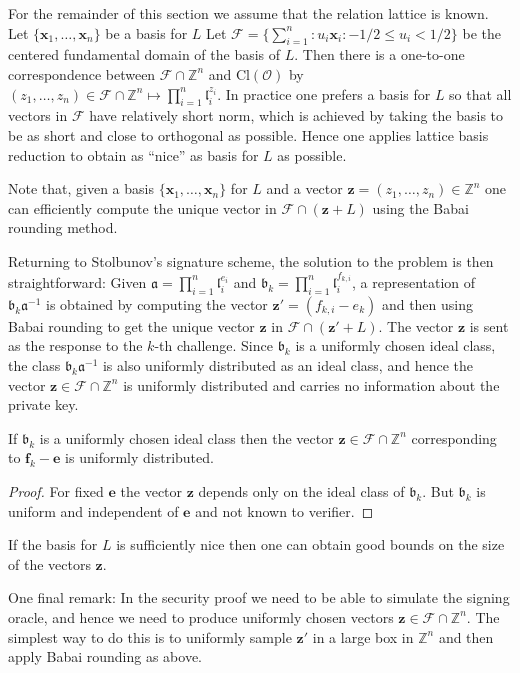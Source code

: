 \documentclass{llncs}
\newcommand{\FF}{\mathcal{F}}
\newcommand{\OO}{\mathcal{O}}
\newcommand{\Z}{\mathbb{Z}}
\newcommand{\Cl}{\text{Cl}}
\renewcommand{\a}{\mathfrak{a}}
\renewcommand{\b}{\mathfrak{b}}
\renewcommand{\l}{\mathfrak{l}}
\newcommand{\e}{\textbf{e}}
\newcommand{\f}{\textbf{f}}
\newcommand{\x}{\textbf{x}}
\newcommand{\z}{\textbf{z}}
\begin{document}
For the remainder of this section we assume that the relation lattice is known.
Let $\{ \x_1, \dots, \x_n \}$ be a basis for $L$
Let $\FF = \{ \sum_{i=1}^n : u_i \x_i : -1/2 \le u_i < 1/2 \}$ be the centered fundamental domain of the basis of $L$.
Then there is a one-to-one correspondence between $\FF \cap \Z^n$ and $\Cl(\OO)$ by
$(z_1, \dots, z_n ) \in \FF \cap \Z^n  \mapsto \prod_{i=1}^n \l_i^{z_i}$.
In practice one prefers a basis for $L$ so that all vectors in $\FF$ have relatively short norm, which is achieved by taking the basis to be as short and close to orthogonal as possible. Hence one applies lattice basis reduction to obtain as ``nice'' as basis for $L$ as possible.

Note that, given a basis $\{ \x_1, \dots, \x_n \}$ for $L$ and a vector $\z = (z_1, \dots, z_n ) \in \Z^n$ one can efficiently compute the unique vector in $\FF \cap (\z + L )$ using the Babai rounding method.



Returning to Stolbunov's signature scheme, the solution to the problem is then straightforward:
Given $\a = \prod_{i=1}^n \l_i^{e_i}$ and $\b_k = \prod_{i=1}^n \l_i^{f_{k,i}}$,
a representation of $\b_k \a^{-1}$ is obtained by computing the vector $\z' = (f_{k,i} - e_k)$
and then using Babai rounding to get the unique vector $\z$ in $\FF \cap (\z' + L )$.
The vector $\z$ is sent as the response to the $k$-th challenge.
Since $\b_k$ is a uniformly chosen ideal class, the class $\b_k \a^{-1}$ is also uniformly distributed as an ideal class, and hence the vector $\z \in \FF \cap \Z^n$ is uniformly distributed and carries no information about the private key.

\begin{lemma}
If $\b_k$ is a uniformly chosen ideal class then the vector 
$\z \in \FF \cap \Z^n$ corresponding to $\f_k - \e$ is uniformly distributed.
\end{lemma}

\begin{proof}
For fixed $\e$ the vector $\z$ depends only on the ideal class of $\b_k$.
But $\b_k$ is uniform and independent of $\e$ and not known to verifier.
\end{proof}



If the basis for $L$ is sufficiently nice then one can obtain good bounds on the size of the vectors $\z$.

One final remark: In the security proof we need to be able to simulate the signing oracle, and hence we need to produce uniformly chosen vectors $\z \in \FF \cap \Z^n$.
The simplest way to do this is to uniformly sample $\z'$ in a large box in $\Z^n$ and then apply Babai rounding as above.
\end{document}
